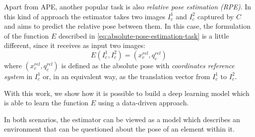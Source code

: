 Apart from APE, another popular task is also \emph{relative pose estimation (RPE)}. In this kind of approach the estimator takes two images $I_c^1$ and $I_c^2$ captured by $C$ and aims to predict the relative pose between them. In this case, the formulation of the function $E$ described in \cref{eq:absolute-pose-estimation-task} is a little different, since it receives as input two images:
\begin{equation}
    E(I_c^1, I_c^2) = (x_c^{rel}, q_c^{rel})
    \label{eq:relative-pose-estimation-task}
\end{equation}
where $(x_c^{rel}, q_c^{rel})$ is defined as the absolute pose with \emph{coordinates reference system} in $I_c^1$ or, in an equivalent way, as the translation vector from $I_c^1$ to $I_c^2$.

With this work, we show how it is possible to build a deep learning model which is able to learn the function $E$ using a data-driven approach.

In both scenarios, the estimator can be viewed as a model which describes an environment that can be questioned about the pose of an element within it.

